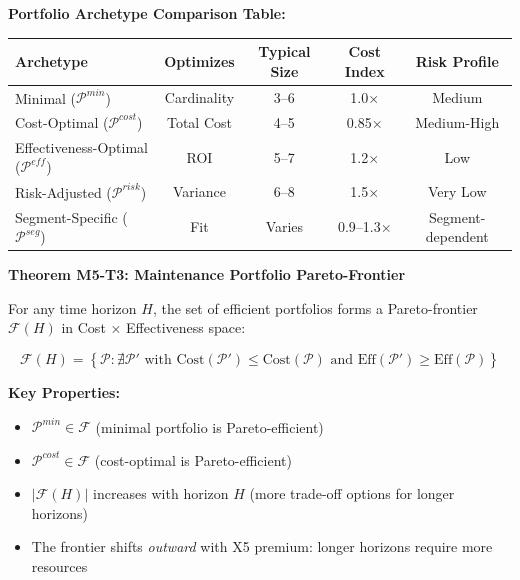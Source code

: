 \textbf{Portfolio Archetype Comparison Table:}

\begin{center}
\renewcommand{\arraystretch}{1.3}
\begin{tabular}{@{}lcccc@{}}
\toprule
\textbf{Archetype} & \textbf{Optimizes} & \textbf{Typical Size} & \textbf{Cost Index} & \textbf{Risk Profile} \\
\midrule
Minimal ($\mathcal{P}^{min}$) & Cardinality & 3--6 & 1.0$\times$ & Medium \\
Cost-Optimal ($\mathcal{P}^{cost}$) & Total Cost & 4--5 & 0.85$\times$ & Medium-High \\
Effectiveness-Optimal ($\mathcal{P}^{eff}$) & ROI & 5--7 & 1.2$\times$ & Low \\
Risk-Adjusted ($\mathcal{P}^{risk}$) & Variance & 6--8 & 1.5$\times$ & Very Low \\
Segment-Specific ($\mathcal{P}^{seg}$) & Fit & Varies & 0.9--1.3$\times$ & Segment-dependent \\
\bottomrule
\end{tabular}
\end{center}

\begin{tcolorbox}[colback=green!5!white, colframe=green!75!black, title=The Pareto-Frontier: Cost vs. Effectiveness (M5-T3)]

\textbf{Theorem M5-T3: Maintenance Portfolio Pareto-Frontier}

For any time horizon $H$, the set of efficient portfolios forms a Pareto-frontier $\mathcal{F}(H)$ in Cost × Effectiveness space:

\[
\mathcal{F}(H) = \left\{ \mathcal{P} : \nexists \mathcal{P}' \text{ with } \text{Cost}(\mathcal{P}') \leq \text{Cost}(\mathcal{P}) \text{ and } \text{Eff}(\mathcal{P}') \geq \text{Eff}(\mathcal{P}) \right\}
\]

\textbf{Key Properties:}
\begin{itemize}[nosep]
\item $\mathcal{P}^{min} \in \mathcal{F}$ (minimal portfolio is Pareto-efficient)
\item $\mathcal{P}^{cost} \in \mathcal{F}$ (cost-optimal is Pareto-efficient)
\item $|\mathcal{F}(H)|$ increases with horizon $H$ (more trade-off options for longer horizons)
\item The frontier shifts \textit{outward} with X5 premium: longer horizons require more resources
\end{itemize}

\end{tcolorbox}

